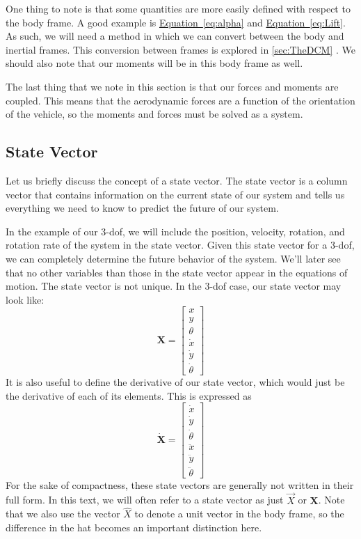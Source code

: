 \documentclass[10pt, openany, titlepage]{book}
\theoremstyle{definition}
\newcounter{example}[chapter]
\newcommand{\eqautoref}[1]{\hyperref[#1]{Equation~\eqref{#1}}}
\let\oldautoref\autoref
\renewcommand{\autoref}[1]{%
  \begingroup
  \hypersetup{linkcolor=black}%
  \oldautoref{#1}%
  \endgroup
}
\begin{document}
One thing to note is that some quantities are more easily defined with respect to the body frame. A good example is \eqautoref{eq:alpha} and \eqautoref{eq:Lift}. As such, we will need a method in which we can convert between the body and \glspl{inertial frame}. This conversion between frames is explored in \autoref{sec:TheDCM}. We should also note that our moments will be in this \gls{body frame} as well.

The last thing that we note in this section is that our forces and moments are coupled. This means that the aerodynamic forces are a function of the orientation of the vehicle, so the moments and forces must be solved as a system.
\subsection{State Vector}
Let us briefly discuss the concept of a \gls{state vector}. The \gls{state vector} is a column vector that contains information on the current state of our system and tells us everything we need to know to predict the future of our system. 

In the example of our 3-\gls{dof}, we will include the position, velocity, rotation, and rotation rate of the system in the \gls{state vector}. Given this state vector for a 3-\gls{dof}, we can completely determine the future behavior of the system. We'll later see that no other variables than those in the state vector appear in the equations of motion. The state vector is not unique. In the 3-\gls{dof} case, our state vector may look like: 
$$\textbf{X}=\begin{bmatrix}
    x\\y\\\theta\\\dot{x}\\\dot{y}\\\dot{\theta}
\end{bmatrix}$$
It is also useful to define the derivative of our \gls{state vector}, which would just be the derivative of each of its elements. This is expressed as
$$\dot{\textbf{X}}=\begin{bmatrix}
    \dot{x}\\\dot{y}\\\dot{\theta}\\\ddot{x}\\\ddot{y}\\\ddot{\theta}
\end{bmatrix}$$
For the sake of compactness, these state vectors are generally not written in their full form. In this text, we will often refer to a \gls{state vector} as just $\vec{X}$ or $\textbf{X}$. Note that we also use the vector $\hat{X}$ to denote a unit vector in the \gls{body frame}, so the difference in the hat becomes an important distinction here.
\end{document}
